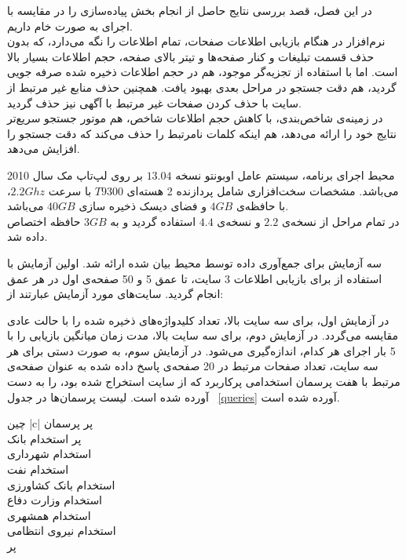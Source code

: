 
در این فصل، قصد بررسی نتایج حاصل از انجام بخش پیاده‌سازی را در مقایسه با اجرای  به صورت خام داریم.
\\
نرم‌افزار  در هنگام بازیابی اطلاعات صفحات، تمام اطلاعات را نگه می‌دارد، که بدون حذف قسمت تبلیغات و کنار صفحه‌ها و تیتر بالای صفحه، حجم اطلاعات بسیار بالا است. اما با استفاده از تجزیه‌گر موجود، هم در حجم اطلاعات ذخیره شده صرفه جویی گردید، هم دقت جستجو در مراحل بعدی بهبود یافت. همچنین حذف منابع غیر مرتبط از سایت با حذف کردن صفحات غیر مرتبط با آگهی نیز حذف گردید.
\\
در زمینه‌ی شاخص‌بندی، با کاهش حجم اطلاعات شاخص، هم موتور جستجو سریع‌تر نتایج خود را ارائه می‌دهد، هم اینکه کلمات نامرتبط را حذف می‌کند که دقت جستجو را افزایش می‌دهد.

محیط اجرای برنامه، سیستم عامل اوبونتو نسخه $13.04$ بر روی لپ‌تاپ مک سال 2010 می‌باشد. مشخصات سخت‌افزاری شامل پردازنده 2 هسته‌ای $T9300$ با سرعت $2.2 Ghz$، با حافظه‌ی $4 GB$ و فضای دیسک ذخیره سازی $40 GB$ می‌باشد.
\\
در تمام مراحل از  نسخه‌ی $2.2$ و  نسخه‌ی $4.4$ استفاده گردید و به   $3 GB$ حافظه اختصاص داده شد.

سه آزمایش برای جمع‌آوری داده توسط محیط بیان شده ارائه شد. اولین آزمایش با استفاده از  برای بازیابی اطلاعات 3 سایت، تا عمق 5 و 50 صفحه‌ی اول در هر عمق انجام گردید. سایت‌های مورد آزمایش عبارتند از:

در آزمایش اول، برای سه سایت بالا، تعداد کلیدواژه‌های ذخیره شده را با حالت عادی مقایسه می‌گردد.
در آزمایش دوم، برای سه سایت بالا، مدت زمان میانگین بازیابی را با 5 بار اجرای هر کدام، اندازه‌گیری می‌شود.
در آزمایش سوم، به صورت دستی برای هر سه سایت، تعداد صفحات مرتبط در 20 صفحه‌ی پاسخ داده شده به عنوان صفحه‌ی مرتبط با هفت پرسمان استخدامی پرکاربرد که از سایت  استخراج شده بود، را به دست آورده شده است. لیست پرسمان‌ها در جدول  ~\ref{queries} آورده شده است.

‌چین
 {|c|}
‌پر
پرسمان \\ ‌پر
استخدام بانک \\
استخدام شهرداری \\
استخدام نفت \\
استخدام بانک کشاورزی \\
استخدام وزارت دفاع \\
استخدام همشهری \\
استخدام نیروی انتظامی \\
‌پر

